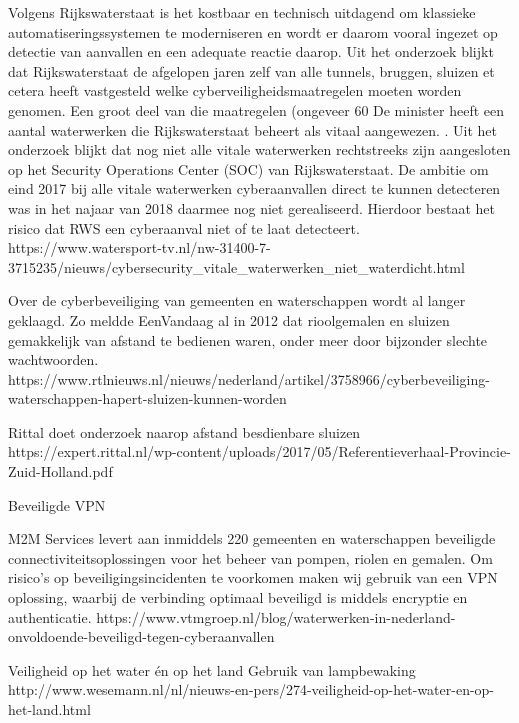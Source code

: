 Volgens Rijkswaterstaat is het kostbaar en technisch uitdagend om klassieke automatiseringssystemen te moderniseren en wordt er daarom vooral ingezet op detectie van aanvallen en een adequate reactie daarop.
Uit het onderzoek blijkt dat Rijkswaterstaat de afgelopen jaren zelf van alle tunnels, bruggen, sluizen et cetera heeft vastgesteld welke cyberveiligheidsmaatregelen moeten worden genomen. Een groot deel van die maatregelen (ongeveer 60%
De minister heeft een aantal waterwerken die Rijkswaterstaat beheert als vitaal aangewezen. . Uit het onderzoek blijkt dat nog niet alle vitale waterwerken rechtstreeks zijn aangesloten op het Security Operations Center (SOC) van Rijkswaterstaat. De ambitie om eind 2017 bij alle vitale waterwerken cyberaanvallen direct te kunnen detecteren was in het najaar van 2018 daarmee nog niet gerealiseerd. Hierdoor bestaat het risico dat RWS een cyberaanval niet of te laat detecteert.
https://www.watersport-tv.nl/nw-31400-7-3715235/nieuws/cybersecurity_vitale_waterwerken_niet_waterdicht.html


Over de cyberbeveiliging van gemeenten en waterschappen wordt al langer geklaagd. Zo meldde EenVandaag al in 2012 dat rioolgemalen en sluizen gemakkelijk van afstand te bedienen waren, onder meer door bijzonder slechte wachtwoorden.
https://www.rtlnieuws.nl/nieuws/nederland/artikel/3758966/cyberbeveiliging-waterschappen-hapert-sluizen-kunnen-worden

Rittal doet onderzoek naarop afstand besdienbare sluizen
https://expert.rittal.nl/wp-content/uploads/2017/05/Referentieverhaal-Provincie-Zuid-Holland.pdf



Beveiligde VPN

M2M Services levert aan inmiddels 220 gemeenten en waterschappen beveiligde connectiviteitsoplossingen voor het beheer van pompen, riolen en gemalen. Om risico’s op beveiligingsincidenten te voorkomen maken wij gebruik van een VPN oplossing, waarbij de verbinding optimaal beveiligd is middels encryptie en authenticatie.
https://www.vtmgroep.nl/blog/waterwerken-in-nederland-onvoldoende-beveiligd-tegen-cyberaanvallen

Veiligheid op het water én op het land
Gebruik van lampbewaking 
http://www.wesemann.nl/nl/nieuws-en-pers/274-veiligheid-op-het-water-en-op-het-land.html



